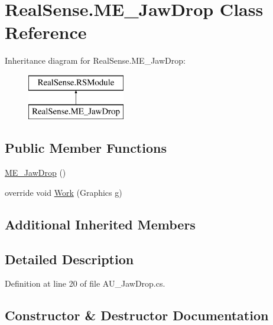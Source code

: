 \hypertarget{class_real_sense_1_1_m_e___jaw_drop}{}\section{Real\+Sense.\+M\+E\+\_\+\+Jaw\+Drop Class Reference}
\label{class_real_sense_1_1_m_e___jaw_drop}
Inheritance diagram for Real\+Sense.\+M\+E\+\_\+\+Jaw\+Drop\+:\begin{figure}[H]
\begin{center}
\leavevmode
\includegraphics[height=2.000000cm]{class_real_sense_1_1_m_e___jaw_drop}
\end{center}
\end{figure}
\subsection*{Public Member Functions}
\begin{DoxyCompactItemize}
\item 
\hyperlink{class_real_sense_1_1_m_e___jaw_drop_a87dd1f182b70dd517508c5fa1d02af2b}{M\+E\+\_\+\+Jaw\+Drop} ()
\item 
override void \hyperlink{class_real_sense_1_1_m_e___jaw_drop_aa73bb6bb3559f0132f1a920b814e46a3}{Work} (Graphics g)
\end{DoxyCompactItemize}
\subsection*{Additional Inherited Members}


\subsection{Detailed Description}


Definition at line 20 of file A\+U\+\_\+\+Jaw\+Drop.\+cs.



\subsection{Constructor \& Destructor Documentation}
\mbox{\label{class_real_sense_1_1_m_e___jaw_drop_a87dd1f182b70dd517508c5fa1d02af2b}} 
